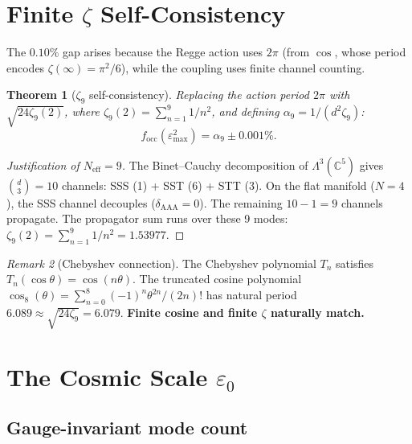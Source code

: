 \documentclass[12pt]{article}
\newtheorem{theorem}{Theorem}[section]
\theoremstyle{definition}
\theoremstyle{remark}
\newtheorem{remark}[theorem]{Remark}
\newcommand{\CC}{\mathbb{C}}
\newcommand{\focc}{f_{\mathrm{occ}}}
\begin{document}
\section{Finite $\zeta$ Self-Consistency}
\label{sec:finite}

The $0.10\%$ gap arises because the Regge action uses $2\pi$
(from $\cos$, whose period encodes $\zeta(\infty) = \pi^2/6$),
while the coupling uses finite channel counting.

\begin{theorem}[$\zeta_9$ self-consistency]
\label{thm:zeta9}
Replacing the action period $2\pi$ with $\sqrt{24\zeta_9(2)}$,
where $\zeta_9(2) = \sum_{n=1}^{9} 1/n^2$, and defining
$\alpha_9 = 1/(d^2\zeta_9)$:
\begin{equation}
\focc(\varepsilon^2_{\max}) = \alpha_9 \pm 0.001\%.
\end{equation}
\end{theorem}

\begin{proof}[Justification of $N_{\text{eff}}=9$]
The Binet--Cauchy decomposition of $\Lambda^3(\CC^5)$ gives
$\binom{d}{3} = 10$ channels: SSS (1) + SST (6) + STT (3).
On the flat manifold ($N=4$), the SSS channel decouples ($\delta_{\text{AAA}}=0$).
The remaining $10-1=9$ channels propagate. The propagator sum
runs over these 9 modes: $\zeta_9(2) = \sum_{n=1}^{9} 1/n^2 = 1.53977$.
\end{proof}

\begin{remark}[Chebyshev connection]
The Chebyshev polynomial $T_n$ satisfies $T_n(\cos\theta) = \cos(n\theta)$.
The truncated cosine polynomial $\cos_8(\theta) = \sum_{n=0}^{8}(-1)^n\theta^{2n}/(2n)!$
has natural period $6.089 \approx \sqrt{24\zeta_9} = 6.079$.
\textbf{Finite cosine and finite $\zeta$ naturally match.}
\end{remark}

\section{The Cosmic Scale $\varepsilon_0$}
\label{sec:epsilon0}

\subsection{Gauge-invariant mode count}
\end{document}

